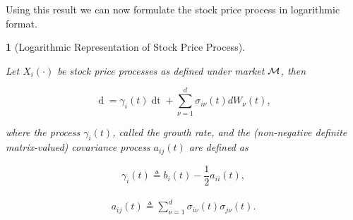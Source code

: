 \documentclass[british]{amsart} \usepackage{lmodern}
\numberwithin{equation}{section} \numberwithin{figure}{section}
\theoremstyle{plain} \newtheorem{thm}{\protect\theoremname}[section]
\theoremstyle{definition} \newtheorem{defn}[thm]{\protect\definitionname}
\theoremstyle{plain} \newtheorem{assumption}[thm]{\protect\assumptionname}
\theoremstyle{plain} \newtheorem{lem}[thm]{\protect\lemmaname}
\theoremstyle{plain} \newtheorem{prop}[thm]{\protect\propositionname}
\theoremstyle{remark} \newtheorem{rem}[thm]{\protect\remarkname}
\theoremstyle{plain} \newtheorem{cor}[thm]{\protect\corollaryname}
\renewcommand{\d}[1]{\mathop{\mathrm{d}{#1}}}
\newcommand{\defeq}{\mathop{\triangleq}} \newcommand{\almostsurely}{\text{a.s.}}
\begin{document}
Using this result we can now formulate the stock price process in logarithmic
format.

\begin{prop} [Logarithmic Representation of Stock Price Process]
  \label{thm:logarithmicrepresentation}

  Let $X_{i}(\cdot)$ be stock price processes as defined under market $\mathcal{M}$,
  then

  \begin{equation}
    \label{eq:dlogX}
        \d{\log{X_{i}(t)}} =
          \gamma_{i}(t) \d{t} +
          \sum_{\nu=1}^{d} \sigma_{i\nu}(t) dW_{\nu}(t),
  \end{equation}

  where the process $\gamma_{i}(t)$, called the \textit{growth rate}, and the
  (non-negative definite matrix-valued) \textit{covariance process} $a_{ij}(t)$
  are defined as

  \begin{equation}
    \label{eq:gamma}
    \gamma_{i}(t)\defeq b_{i}(t)-\frac{1}{2}a_{ii}(t),
  \end{equation}

  \begin{gather}
    \label{eq:covarianceprocess}
    \begin{split}
      a_{ij}(t)
         \defeq \sum_{\nu=1}^{d}\sigma_{i\nu}(t)\sigma_{j\nu}(t).
    \end{split}
  \end{gather}

\end{prop}
\end{document}

